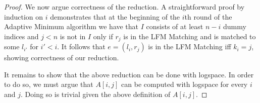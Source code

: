 \documentclass[11pt]{article}
\newcommand{\am}{\textsf{Adaptive Minimum}\xspace}
\newcommand{\lfm}{\textsf{LFM Matching}\xspace}
\DeclareMathOperator*{\argmin}{arg\,min}
\begin{document}
\begin{proof}
    We now argue correctness of the reduction. A straightforward proof by induction on $i$ demonstrates that at the beginning of the $i$th round of the \am algorithm we have that $I$ consists of at least $n-i$ dummy indices and $j < n$ is not in $I$ only if $r_j$ is in the \lfm and is matched to some $l_{i'}$ for $i' < i$. It follows that $e = (l_i, r_j)$ is in the \lfm iff $k_i = j$, showing correctness of our reduction. %

    It remains to show that the above reduction can be done with logspace. In order to do so, we must argue that $A[i,j]$ can be computed with logspace for every $i$ and $j$. Doing so is trivial given the above definition of $A[i,j]$. 
\end{proof}
\end{document}
